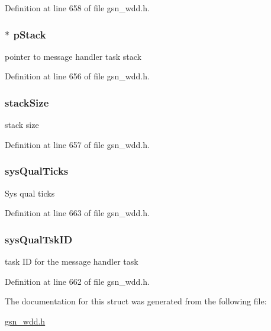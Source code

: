 Definition at line 658 of file gsn\_\-wdd.h.

\hypertarget{a00280_a06dc12db7ec3c52d8dc551e9e8f77e63}{
\subsubsection[{pStack}]{$\ast$ {\bf pStack}}}
\label{a00280_a06dc12db7ec3c52d8dc551e9e8f77e63}
pointer to message handler task stack 

Definition at line 656 of file gsn\_\-wdd.h.

\hypertarget{a00280_a82cabdcaee43fc729a1da5551d429f73}{
\subsubsection[{stackSize}]{ {\bf stackSize}}}
\label{a00280_a82cabdcaee43fc729a1da5551d429f73}
stack size 

Definition at line 657 of file gsn\_\-wdd.h.

\hypertarget{a00280_a3b8eb219c70a5f7fc6dcb9d9643cbc31}{
\subsubsection[{sysQualTicks}]{ {\bf sysQualTicks}}}
\label{a00280_a3b8eb219c70a5f7fc6dcb9d9643cbc31}
Sys qual ticks 

Definition at line 663 of file gsn\_\-wdd.h.

\hypertarget{a00280_a3e06cb8fa58f49b7004a85c6f387ddc7}{
\subsubsection[{sysQualTskID}]{ {\bf sysQualTskID}}}
\label{a00280_a3e06cb8fa58f49b7004a85c6f387ddc7}
task ID for the message handler task 

Definition at line 662 of file gsn\_\-wdd.h.



The documentation for this struct was generated from the following file:\begin{DoxyCompactItemize}
\item 
\hyperlink{a00603}{gsn\_\-wdd.h}\end{DoxyCompactItemize}
